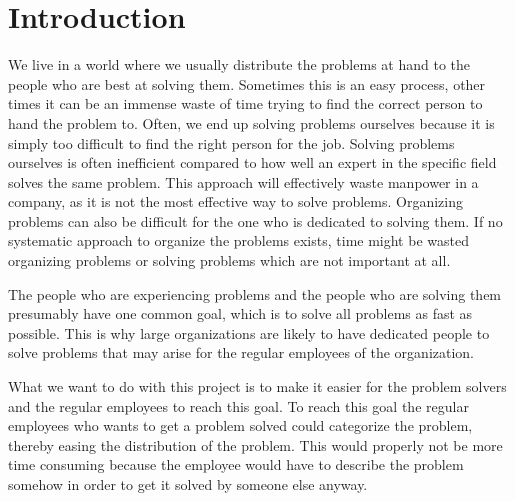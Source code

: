 \chapter{Introduction}
\label{sec:introduction}
\emptyTop{}%


We live in a world where we usually distribute the problems at hand to the people who are best at solving them.
Sometimes this is an easy process, other times it can be an immense waste of time trying to find the correct person to hand the problem to.
Often, we end up solving problems ourselves because it is simply too difficult to find the right person for the job.
Solving problems ourselves is often inefficient compared to how well an expert in the specific field solves the same problem.
This approach will effectively waste manpower in a company, as it is not the most effective way to solve problems.
Organizing problems can also be difficult for the one who is dedicated to solving them.
If no systematic approach to organize the problems exists, time might be wasted organizing problems or solving problems which are not important at all.

The people who are experiencing problems and the people who are solving them presumably have one common goal, which is to solve all problems as fast as possible.
This is why large organizations are likely to have dedicated people to solve problems that may arise for the regular employees of the organization.

What we want to do with this project is to make it easier for the problem solvers and the regular employees to reach this goal.
To reach this goal the regular employees who wants to get a problem solved could categorize the problem, thereby easing the distribution of the problem.
This would properly not be more time consuming because the employee would have to describe the problem somehow in order to get it solved by someone else anyway.

